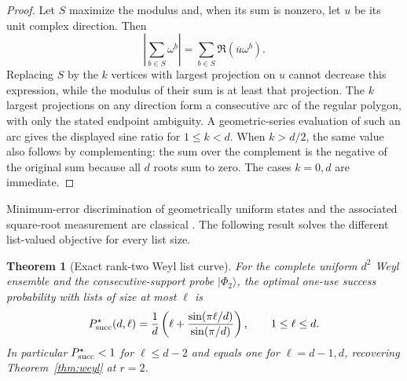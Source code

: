 \documentclass[11pt,a4paper]{article}
\newtheorem{theorem}{Theorem}[section]
\newcommand{\ket}[1]{\lvert #1\rangle}
\begin{document}
\begin{proof}
Let $S$ maximize the modulus and, when its sum is nonzero, let $u$ be its
unit complex direction.  Then
\[
 \left|\sum_{b\in S}\omega^b\right|
 =\sum_{b\in S}\Re(\overline u\omega^b).
\]
Replacing $S$ by the $k$ vertices with largest projection on $u$ cannot
decrease this expression, while the modulus of their sum is at least that
projection.  The $k$ largest projections on any direction form a consecutive
arc of the regular polygon, with only the stated endpoint ambiguity.  A
geometric-series evaluation of such an arc gives the displayed sine ratio
for $1\le k<d$.  When $k>d/2$, the same value also follows by complementing:
the sum over the complement is the negative of the original sum because all
$d$ roots sum to zero.  The cases $k=0,d$ are immediate.
\end{proof}

Minimum-error discrimination of geometrically uniform states and the
associated square-root measurement are classical
\cite{EldarForney2001}.  The following result solves the different
list-valued objective for every list size.

\begin{theorem}[Exact rank-two Weyl list curve]\label{thm:ranktwocurve}
For the complete uniform $d^2$ Weyl ensemble and the consecutive-support
probe $\ket{\Phi_2}$, the optimal one-use success probability with lists of
size at most $\ell$ is
\begin{equation}\label{eq:ranktwocurve}
 P_{\rm succ}^{\star}(d,\ell)
 =\frac{1}{d}\left(
 \ell+\frac{\sin(\pi\ell/d)}{\sin(\pi/d)}\right),
 \qquad 1\le\ell\le d.
\end{equation}
In particular $P_{\rm succ}^{\star}<1$ for $\ell\le d-2$ and equals one for
$\ell=d-1,d$, recovering Theorem~\ref{thm:weyl} at $r=2$.
\end{theorem}
\end{document}
